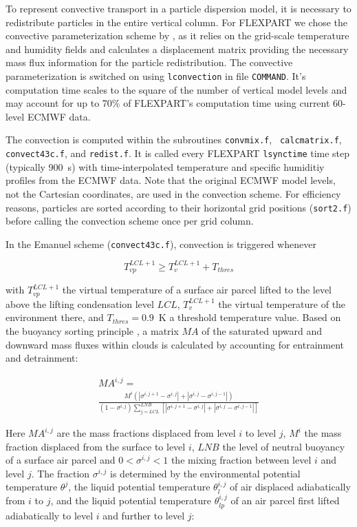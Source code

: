 \documentclass{egu}            %
\begin{document}
To represent convective transport in a particle dispersion model, it is
necessary to redistribute particles in the entire vertical column.  For
FLEXPART we chose the convective parameterization scheme by
\citet{emanuel1999}, as it relies on the grid-scale temperature and humidity
fields and calculates a displacement matrix providing the necessary mass flux
information for the particle redistribution.  The convective parameterization
is switched on using \verb|lconvection| in file \verb|COMMAND|.  It's
computation time scales to the square of the number of vertical model levels
and may account for up to 70\% of FLEXPART's computation time using current
60-level ECMWF data.

The convection is computed within the subroutines {\tt convmix.f}, {\tt
calcmatrix.f}, {\tt convect43c.f}, and {\tt redist.f}.  It is called every
FLEXPART \verb|lsynctime| time step (typically 900~s) with time-interpolated
temperature and specific humiditiy profiles from the ECMWF data.  Note that the
original ECMWF model levels, not the Cartesian coordinates, are used in the
convection scheme.  For efficiency reasons, particles are sorted according to
their horizontal grid positions ({\tt sort2.f}) before calling the convection
scheme once per grid column.

In the Emanuel scheme ({\tt convect43c.f}), convection is triggered whenever

\begin{equation}
T_{vp}^{LCL+1} \ge T_{v}^{LCL+1} + T_{thres}
\end{equation} 

with $T_{vp}^{LCL+1}$ the virtual temperature of a surface air parcel lifted to
the level above the lifting condensation level $LCL$, $T_{v}^{LCL+1}$ the
virtual temperature of the environment there, and $T_{thres}=0.9$~K a threshold
temperature value.  Based on the buoyancy sorting principle \citep{emanuel1991,
telford1975}, a matrix $MA$ of the saturated upward and downward mass fluxes
within clouds is calculated by accounting for entrainment and detrainment:

\begin{multline}
MA^{i,j}=\\
\frac{M^i(|\sigma^{i,j+1}- \sigma^{i,j}|+ |\sigma^{i,j} - \sigma^{i,j-1}|)}{(1-\sigma^{i,j}) \displaystyle \sum_{j=LCL}^{LNB} [|\sigma^{i,j+1}- \sigma^{i,j}|+ |\sigma^{i,j} - \sigma^{i,j-1}|]}
\label{matrix}
\end{multline}

Here $MA^{i,j}$ are the mass fractions displaced from level $i$ to level $j$,
$M^{i}$ the mass fraction displaced from the surface to level $i$, $LNB$ the
level of neutral buoyancy of a surface air parcel and $0 < \sigma^{i,j} < 1 $
the mixing fraction between level $i$ and level $j$.  The fraction
$\sigma^{i,j}$ is determined by the environmental potential temperature
$\theta^{j}$, the liquid potential temperature $\theta_{l}^{i,j}$ of air
displaced adiabatically from $i$ to $j$, and the liquid potential temperature
$\theta_{lp}^{i,j}$ of an air parcel first lifted adiabatically to level $i$
and further to level $j$:
\end{document}
